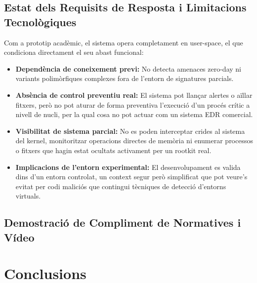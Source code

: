 \documentclass[12pt,a4paper]{report}
\begin{document}
\section{Estat dels Requisits de Resposta i Limitacions Tecnològiques}
Com a prototip acadèmic, el sistema opera completament en user-space, el que condiciona directament el seu abast funcional:
\begin{itemize}
    \item \textbf{Dependència de coneixement previ:} No detecta amenaces zero-day ni variants polimòrfiques complexes fora de l'entorn de signatures parcials.
    \item \textbf{Absència de control preventiu real:} El sistema pot llançar alertes o aïllar fitxers, però no pot aturar de forma preventiva l'execució d'un procés crític a nivell de nucli, per la qual cosa no pot actuar com un sistema EDR comercial.
    \item \textbf{Visibilitat de sistema parcial:} No es poden interceptar crides al sistema del kernel, monitoritzar operacions directes de memòria ni enumerar processos o fitxers que hagin estat ocultats activament per un rootkit real.
    \item \textbf{Implicacions de l'entorn experimental:} El desenvolupament es valida dins d'un entorn controlat, un context segur però simplificat que pot veure's evitat per codi maliciós que contingui tècniques de detecció d'entorns virtuals.
\end{itemize}

\section{Demostració de Compliment de Normatives i Vídeo}


\chapter{Conclusions}
\label{ch:conclusions}
\end{document}
